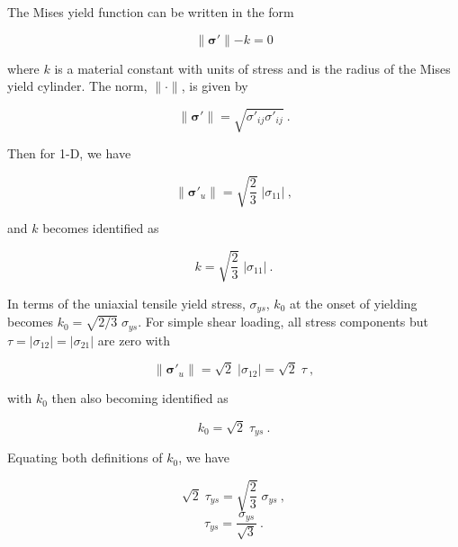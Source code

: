 \documentclass[11pt]{report}
\numberwithin{equation}{section}
\newcommand{\bmf } {\boldsymbol }
\begin{document}
The Mises yield function can be written in the form

\begin{equation}\label{E:vm_define_1}
\parallel \bmf \sigma' \parallel - k = 0
\end{equation}

\noindent where $k$ is a material constant with units of 
stress and is the radius of the Mises yield cylinder. The norm,
$\parallel \cdot \parallel$, is given by

\begin{equation}
\parallel \bmf \sigma' \parallel = \sqrt{ \sigma'_{ij} \sigma'_{ij} }~.
\end{equation}

\noindent Then for 1-D, we have

\begin{equation}
\parallel \bmf \sigma'_u \parallel = \sqrt{ \textstyle 
{\frac{2}{3}} }\; |\sigma_{11}|~,
\end{equation}

\noindent and $k$ becomes identified as

\begin{equation}\label{E:k_sigma_11_define}
 k = \sqrt{ \textstyle {\frac{2}{3}} }\; |\sigma_{11}|~.
\end{equation}

\noindent In terms of the uniaxial tensile yield stress, $\sigma_{ys}$, $k_0$ at 
the onset of yielding becomes 
$k_0 = \sqrt{2/3} \; \sigma_{ys}$. For simple shear
loading, all stress components but $\tau = |\sigma_{12}| = |\sigma_{21}|$
are zero with

\begin{equation}
\parallel \bmf \sigma'_u \parallel = \sqrt{2} \; |\sigma_{12}| = \sqrt{2} \; \tau~,
\end {equation}

\noindent with $k_0$ then also becoming identified as 

\begin{equation}\label{E:k_shear_define}
k_0 = \sqrt{2}\;  \tau_{ys}~.
\end{equation}

\noindent Equating both definitions of $k_0$, we have

\begin{equation}
\sqrt{2} \; \tau_{ys} = \sqrt{ \textstyle {\frac{2}{3}} } \; \sigma_{ys}~,
\end{equation}
\begin{equation}
\tau_{ys} = \frac{\sigma_{ys}}{ \sqrt{3}}~.
\end{equation}
\end{document}
